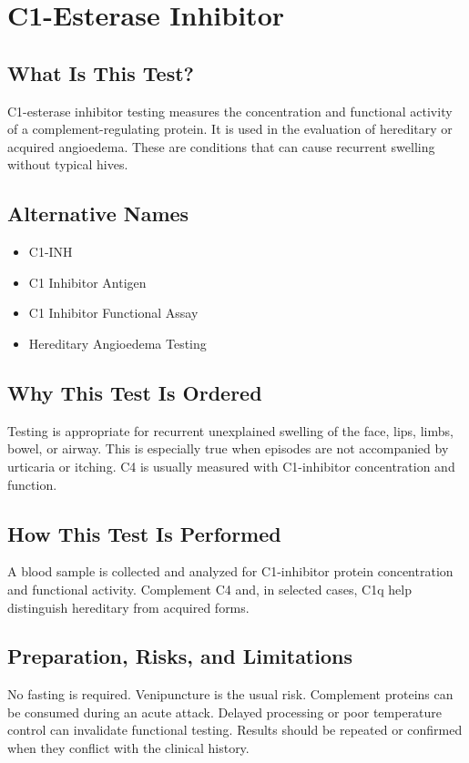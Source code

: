 \chapter{C1-Esterase Inhibitor}

\section*{What Is This Test?}
C1-esterase inhibitor testing measures the concentration and functional activity of a complement-regulating protein. It is used in the evaluation of hereditary or acquired angioedema. These are conditions that can cause recurrent swelling without typical hives.

\section*{Alternative Names}
\begin{itemize}
  \item C1-INH
  \item C1 Inhibitor Antigen
  \item C1 Inhibitor Functional Assay
  \item Hereditary Angioedema Testing
\end{itemize}
\section*{Why This Test Is Ordered}
Testing is appropriate for recurrent unexplained swelling of the face, lips, limbs, bowel, or airway. This is especially true when episodes are not accompanied by urticaria or itching. C4 is usually measured with C1-inhibitor concentration and function.

\section*{How This Test Is Performed}
A blood sample is collected and analyzed for C1-inhibitor protein concentration and functional activity. Complement C4 and, in selected cases, C1q help distinguish hereditary from acquired forms.

\section*{Preparation, Risks, and Limitations}
No fasting is required. Venipuncture is the usual risk. Complement proteins can be consumed during an acute attack. Delayed processing or poor temperature control can invalidate functional testing. Results should be repeated or confirmed when they conflict with the clinical history.

